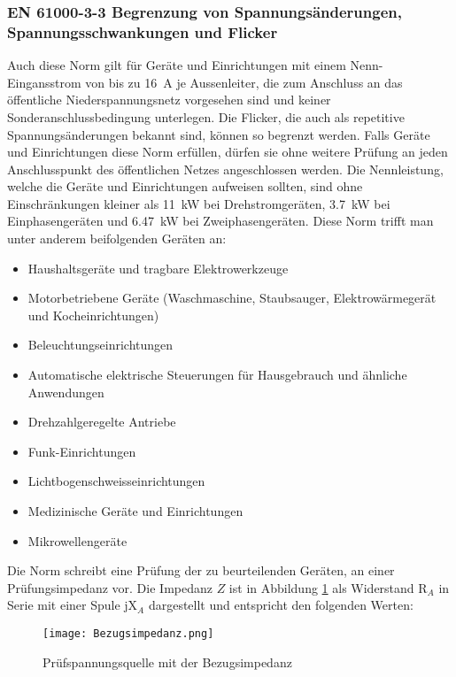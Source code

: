 \begin{appendix}
\subsubsection{EN 61000-3-3 Begrenzung von Spannungsänderungen, Spannungsschwankungen und Flicker}
Auch diese Norm gilt für Geräte und Einrichtungen mit einem Nenn-Eingansstrom von bis zu \SI{16}{A} je Aussenleiter, die zum Anschluss an das öffentliche Niederspannungsnetz vorgesehen sind und keiner Sonderanschlussbedingung unterlegen. Die Flicker, die auch als repetitive Spannungsänderungen bekannt sind, können so begrenzt werden. Falls Geräte und Einrichtungen diese Norm erfüllen, dürfen sie ohne weitere Prüfung an jeden Anschlusspunkt des öffentlichen Netzes angeschlossen werden. Die Nennleistung, welche die Geräte und Einrichtungen aufweisen sollten, sind ohne Einschränkungen kleiner als \SI{11}{kW} bei Drehstromgeräten, \SI{3.7}{kW} bei Einphasengeräten und \SI{6.47}{kW} bei Zweiphasengeräten. Diese Norm trifft man unter anderem beifolgenden Geräten an:
\begin{itemize}
	\item Haushaltsgeräte und tragbare Elektrowerkzeuge 
	\item Motorbetriebene Geräte (Waschmaschine, Staubsauger, Elektrowärmegerät und Kocheinrichtungen)
	\item Beleuchtungseinrichtungen
	\item Automatische elektrische Steuerungen für Hausgebrauch und ähnliche Anwendungen
	\item Drehzahlgeregelte Antriebe
	\item Funk-Einrichtungen
	\item Lichtbogenschweisseinrichtungen
	\item Medizinische Geräte und Einrichtungen
	\item Mikrowellengeräte	
\end{itemize}

Die Norm schreibt eine Prüfung der zu beurteilenden Geräten, an einer Prüfungsimpedanz vor. Die Impedanz $Z$ ist in Abbildung \ref{fig:Bezugsimpedanz} als Widerstand R$_A$ in Serie mit einer Spule jX$_A$ dargestellt und entspricht den folgenden Werten:


\begin{figure}[ht!]
	\centering
	\texttt{[image: Bezugsimpedanz.png]}	
	\caption{Prüfspannungsquelle mit der Bezugsimpedanz}
	\label{fig:Bezugsimpedanz}
\end{figure}


\end{appendix}
